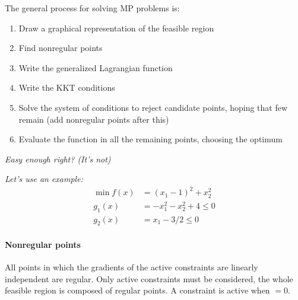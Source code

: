The general process for solving MP problems is: 
\begin{enumerate}
	\item Draw a graphical representation of the feasible region
	
	\item Find nonregular points
	
	\item Write the generalized Lagrangian function
	
	\item Write the KKT conditions
	
	\item Solve the system of conditions to reject candidate points, hoping that few remain (add nonregular points after this)
	
	\item Evaluate the function in all the remaining points, choosing the optimum
\end{enumerate}

\textit{Easy enough right? (It's not)}


%

\textit{Let's use an example:
\begin{align*}
	\min f(x) & = (x_1 - 1)^2 + x_2^2 \\
	g_1 (x) & = -x_1^2 -x_2^2 + 4 \leq 0 \\
	g_2 (x) & = x_1 - 3/2 \leq 0
\end{align*}}

\paragraph{Nonregular points} All points in which the gradients of the active constraints are linearly independent are regular. Only active constraints must be considered, the whole feasible region is composed of regular points. A constraint is active when $= 0$. 

